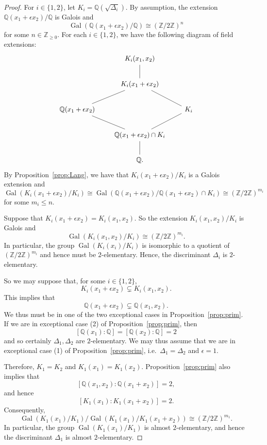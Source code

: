 \documentclass[12pt,a4paper,oneside]{amsart}
\DeclareMathOperator{\gal}{Gal}
\begin{document}
    \begin{proof}
        For $i \in \{1, 2\}$, let $K_i = \mathbb{Q}(\sqrt{\Delta_i})$. By assumption, the extension $\mathbb{Q}(x_1 + \epsilon x_2) / \mathbb{Q}$ is Galois and 
        \[ \gal\left(\mathbb{Q}\left(x_1 + \epsilon x_2\right) / \mathbb{Q}\right) \cong (\mathbb{Z} / 2 \mathbb{Z})^n\]
        for some $n \in \mathbb{Z}_{\geq 0}$. For each $i \in \{1, 2\}$, we have the following diagram of field extensions:
\[
\begin{tikzcd}[row sep=2em, column sep=2em, arrows=-]
& K_i(x_1, x_2) \arrow[d]& \\
& K_i(x_1 + \epsilon x_2) \arrow[dl] \arrow[dr] &\\
\mathbb{Q}(x_1 + \epsilon x_2) \arrow[dr] & & K_i \arrow[dl] \\
& \mathbb{Q}(x_1 + \epsilon x_2) \cap K_i \arrow[d] &\\
& \mathbb{Q}. &
\end{tikzcd}
\]
By Proposition~\ref{prop:Lang}, we have that $K_i(x_1 + \epsilon x_2) / K_i$ is a Galois extension and
\[ \gal\left(K_i\left(x_1 + \epsilon x_2\right) / K_i\right) \cong \gal\left(\mathbb{Q}\left(x_1 + \epsilon x_2\right) / \mathbb{Q}\left(x_1 + \epsilon x_2\right) \cap K_i\right) \cong (\mathbb{Z} / 2 \mathbb{Z})^{m_i}\]
for some $m_i \leq n$.

Suppose that $K_i(x_1 + \epsilon x_2) = K_i(x_1, x_2)$. So the extension $K_i(x_1, x_2) / K_i$ is Galois and
\[ \gal\left(K_i\left(x_1, x_2\right) / K_i\right) \cong  (\mathbb{Z} / 2 \mathbb{Z})^{m_i}.\]
In particular, the group $\gal(K_i(x_i) / K_i)$ is isomorphic to a quotient of $(\mathbb{Z} / 2 \mathbb{Z})^{m_i}$ and hence must be $2$-elementary. Hence, the discriminant $\Delta_i$ is $2$-elementary.

So we may suppose that, for some $i \in \{1, 2\}$, 
\[ K_i(x_1 + \epsilon x_2) \subsetneq K_i(x_1, x_2).\]
This implies that
\[ \mathbb{Q}(x_1 + \epsilon x_2) \subsetneq \mathbb{Q}(x_1, x_2).\]
We thus must be in one of the two exceptional cases in Proposition~\ref{prop:prim}. If we are in exceptional case (2) of Proposition~\ref{prop:prim}, then 
\[ [ \mathbb{Q}(x_1) : \mathbb{Q} ] = [ \mathbb{Q}(x_2) : \mathbb{Q} ] = 2\]
and so certainly $\Delta_1, \Delta_2$ are $2$-elementary. We may thus assume that we are in exceptional case (1) of Proposition~\ref{prop:prim}, i.e.~$\Delta_1 = \Delta_2$ and $\epsilon = 1$.

Therefore, $K_1 = K_2$ and $K_1(x_1) = K_1(x_2)$. Proposition~\ref{prop:prim} also implies that
\[ \left[ \mathbb{Q}\left(x_1, x_2\right) : \mathbb{Q}\left(x_1 + x_2\right)\right] = 2,\]
and hence
\[ \left[K_1\left(x_1\right) : K_1\left(x_1 + x_2\right)\right] = 2.\]
Consequently,
\[ \gal\left(K_1\left(x_1\right) / K_1\right) / \gal\left(K_1(x_1)/ K_1(x_1 + x_2)\right) \cong (\mathbb{Z} / 2 \mathbb{Z})^{m_1}.\]
In particular, the group $\gal(K_1(x_1) / K_1)$ is almost $2$-elementary, and hence the discriminant $\Delta_1$ is almost $2$-elementary.
    \end{proof}
    
\end{document}
